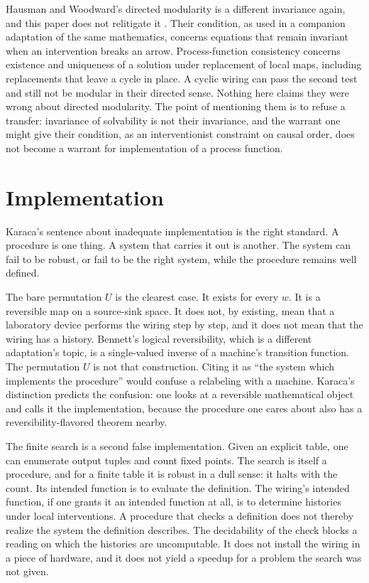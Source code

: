 \documentclass[12pt]{article}
\begin{document}
Hausman and Woodward's directed modularity is a different invariance again, and this paper does not relitigate it \citep{hausman1999}. Their condition, as used in a companion adaptation of the same mathematics, concerns equations that remain invariant when an intervention breaks an arrow. Process-function consistency concerns existence and uniqueness of a solution under replacement of local maps, including replacements that leave a cycle in place. A cyclic wiring can pass the second test and still not be modular in their directed sense. Nothing here claims they were wrong about directed modularity. The point of mentioning them is to refuse a transfer: invariance of solvability is not their invariance, and the warrant one might give their condition, as an interventionist constraint on causal order, does not become a warrant for implementation of a process function.

\section{Implementation}
\label{sec:impl}

Karaca's sentence about inadequate implementation is the right standard. A procedure is one thing. A system that carries it out is another. The system can fail to be robust, or fail to be the right system, while the procedure remains well defined.

The bare permutation \(U\) is the clearest case. It exists for every \(w\). It is a reversible map on a source-sink space. It does not, by existing, mean that a laboratory device performs the wiring step by step, and it does not mean that the wiring has a history. Bennett's logical reversibility, which is a different adaptation's topic, is a single-valued inverse of a machine's transition function. The permutation \(U\) is not that construction. Citing it as ``the system which implements the procedure'' would confuse a relabeling with a machine. Karaca's distinction predicts the confusion: one looks at a reversible mathematical object and calls it the implementation, because the procedure one cares about also has a reversibility-flavored theorem nearby.

The finite search is a second false implementation. Given an explicit table, one can enumerate output tuples and count fixed points. The search is itself a procedure, and for a finite table it is robust in a dull sense: it halts with the count. Its intended function is to evaluate the definition. The wiring's intended function, if one grants it an intended function at all, is to determine histories under local interventions. A procedure that checks a definition does not thereby realize the system the definition describes. The decidability of the check blocks a reading on which the histories are uncomputable. It does not install the wiring in a piece of hardware, and it does not yield a speedup for a problem the search was not given.
\end{document}

